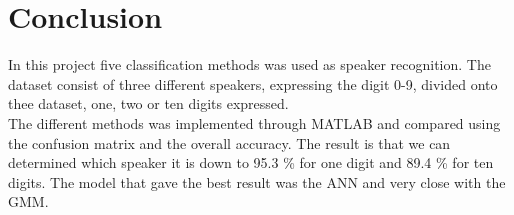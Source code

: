 \section*{Conclusion}
In this project five classification methods was used as speaker recognition.
The dataset consist of three different speakers, expressing the digit 0-9, divided onto thee dataset, one, two or ten digits expressed.\\

The different methods was implemented through MATLAB and compared using the confusion matrix and the overall accuracy. The result is that we can determined which speaker it is down to 95.3 \% for one digit and 89.4 \% for ten digits. The model that gave the best result was the ANN and very close with the GMM.  

  